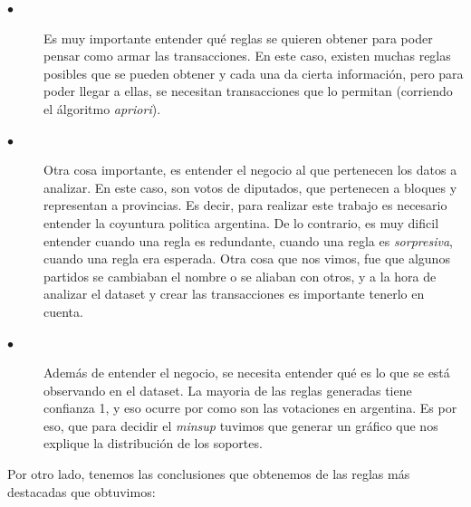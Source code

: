 \documentclass{endm}
\begin{document}
\begin{description}
\item[$\bullet$] Es muy importante entender qué reglas se quieren obtener para poder pensar como armar las transacciones. En este caso, existen muchas reglas posibles que se pueden obtener y cada una da cierta información, pero para poder llegar a ellas, se necesitan transacciones que lo permitan (corriendo el álgoritmo \textit{apriori}).
\item[$\bullet$] Otra cosa importante, es entender el negocio al que pertenecen los datos a analizar. En este caso, son votos de diputados, que pertenecen a bloques y representan a provincias. Es decir, para realizar este trabajo es necesario entender la coyuntura politica argentina. De lo contrario, es muy dificil entender cuando una regla es redundante, cuando una regla es \textit{sorpresiva}, cuando una regla era esperada. Otra cosa que nos vimos, fue que algunos partidos se cambiaban el nombre o se aliaban con otros, y a la hora de analizar el dataset y crear las transacciones es importante tenerlo en cuenta.
\item [$\bullet$] Además de entender el negocio, se necesita entender qué es lo que se está observando en el dataset. La mayoria de las reglas generadas tiene confianza 1, y eso ocurre por como son las votaciones en argentina. Es por eso, que para decidir el \textit{minsup} tuvimos que generar un gráfico que nos explique la distribución de los soportes. \\
\end{description} 

Por otro lado, tenemos las conclusiones que obtenemos de las reglas más destacadas que obtuvimos:
\end{document}
